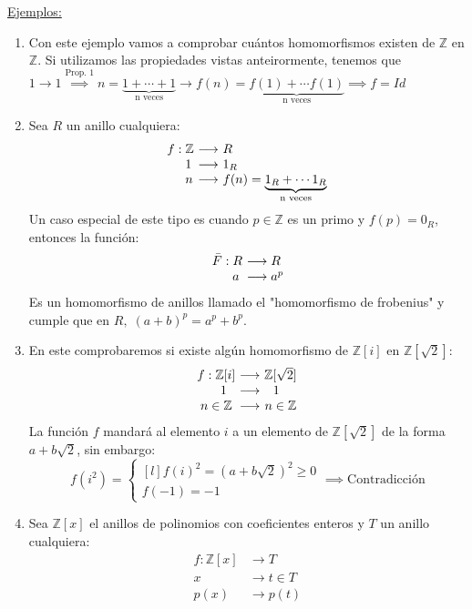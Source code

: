 \documentclass[10pt, a4paper]{article}
\newcommand{\Z}{\mathbb{Z}}
\newcommand{\ejs}{\underline{Ejemplos:} }
\newcommand{\bs}{\!\!\!\!}
\newenvironment{enumeratea}{\begin{enumerate}[label=\arabic*)]}
{\end{enumerate}}
\begin{document}
\ejs 
\begin{enumeratea}
	\item Con este ejemplo vamos a comprobar cuántos homomorfismos existen de $\Z$ en $\Z$.
	Si utilizamos las propiedades vistas anteirormente, tenemos que $1 \longrightarrow 1 \overset{\text{Prop. 1}}{\implies} n = \underbrace{1 + \cdots + 1}_{\text{n veces}} \longrightarrow f(n) = \underbrace{f(1) + \cdots f(1)}_{\text{n veces}} \implies f = Id$
	\item Sea $R$ un anillo cualquiera:
	\[
	\begin{matrix*}[l]
		f : \Z &\bs\longrightarrow &\bs R \\
		\hspace{5mm} 1 &\bs\longrightarrow & \bs1_R \\
		\hspace{5mm} n &\bs\longrightarrow &\bs f(n) = \underbrace{1_R + \cdots 1_R}_{\text{n veces}}
	\end{matrix*}
	\]
	Un caso especial de este tipo es cuando $p \in \Z$ es un primo y $f(p) = 0_R$, entonces la función:
	\[
		\begin{array}{cl}
			\bar{F} : R &\bs\longrightarrow R \\
			\hphantom{F :} a &\bs\longrightarrow a^p
		\end{array}
	\]
	Es un homomorfismo de anillos llamado el "homomorfismo de frobenius" \label{homo_frobenius} y cumple que en $R, \; {(a + b)}^p = a^p + b^p$.
	
	\item En este comprobaremos si existe algún homomorfismo de $\Z[i]$ en $\Z[\sqrt{2}]$:
	\[
	\begin{matrix}
		f : \Z[i] &\bs\longrightarrow& \bs\Z[\sqrt{2}] \\
		\hphantom{f :} 1 &\bs\longrightarrow& \bs\bs1 \\
		n \in \Z & \bs\longrightarrow& \bs n \in \Z
	\end{matrix}
	\]
	La función $f$ mandará al elemento $i$ a un elemento de $\Z[\sqrt{2}]$ de la forma $a + b\sqrt{2}$, sin embargo: 
	\[f(i^2) = \left \{
	\begin{matrix*}[l]
		{f(i)}^2 = {(a + b\sqrt{2})}^2 \geq 0\\
		f(-1) = -1
	\end{matrix*} \right . \implies \text{Contradicción}
	\]
	\item Sea $\Z[x]$ el anillos de polinomios con coeficientes enteros y $T$ un anillo cualquiera:
	\[
	\begin{array}{rl}
		f : \Z[x] &\bs\longrightarrow T \\
		x\;\; &\bs\longrightarrow t \in T \\
		p(x) &\bs\longrightarrow p(t)
	\end{array}
	\]
\end{enumeratea}
\end{document}
